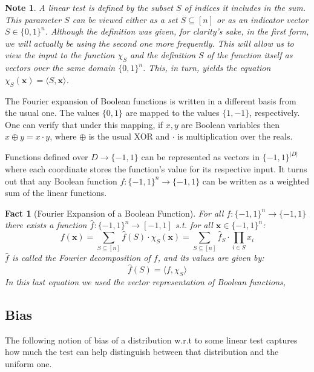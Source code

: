 \documentclass[12pt]{article}
\newtheorem{fact}[theorem]{Fact}
\newtheorem{note}[theorem]{Note}
\newcommand{\zo}[1]{\{0,1\}^{#1}}
\newcommand{\oo}[1]{\{-1,1\}^{#1}}
\newcommand{\abs}[1]{\left| #1 \right|}
\renewcommand{\vec}[1]{\bm{#1}}
\begin{document}
	\begin{note}
		A linear test is defined by the subset $S$ of indices it includes in the sum.
		This parameter $S$ can be viewed either as a set $S \subseteq \left[n\right]$ or as an indicator vector $S \in \zo{n}$.
		Although the definition was given, for clarity's sake, in the first form, we will actually be using the second one more frequently.
		This will allow us to view the input to the function $\chi_S$ and the definition $S$ of the function itself as vectors over the same domain $\zo{n}$.
		This, in turn, yields the equation $\chi_S(\vec{x}) = \langle S, \vec{x} \rangle$.
	\end{note}
	
	The Fourier expansion of Boolean functions is written in a different basis from the usual one.
	The values $\{0,1\}$ are mapped to the values $\{1,-1\}$, respectively.
	One can verify that under this mapping, if $x,y$ are Boolean variables then $x \oplus y = x \cdot y$, where $\oplus$ is the usual XOR and $\cdot$ is multiplication over the reals.
	
	Functions defined over $D \rightarrow \{-1,1\}$ can be represented as vectors in $\{-1,1\}^{\abs{D}}$ where each coordinate stores the function's value for its respective input.
	It turns out that any Boolean function $f : \oo{n} \rightarrow \{-1,1\}$ can be written as a weighted sum of the linear functions.
	\begin{fact}[Fourier Expansion of a Boolean Function] \label{Fact: Fourier expansion}
		For all $f : \oo{n} \rightarrow \{-1,1\}$ there exists a function $\hat{f}: \oo{n} \rightarrow \left[-1,1\right]$ s.t. for all $\vec{x} \in \oo{n}$:
		\begin{equation*}
			f(\vec{x}) = \sum_{S \subseteq \left[n\right]} \hat{f}(S) \cdot \chi_S(\vec{x}) = \sum_{S \subseteq \left[n\right]} \hat{f}_S \cdot \prod_{i \in S} x_i
		\end{equation*}
		$\hat{f}$ is called the \emph{Fourier decomposition} of $f$, and its values are given by:
		\[\hat{f}(S) = \langle f, \chi_S \rangle \]
		In this last equation we used the vector representation of Boolean functions,
	\end{fact}
	
	\subsection{Bias}
	
	The following notion of bias of a distribution w.r.t to some linear test captures how much the test can help distinguish between that distribution and the uniform one.
	
\end{document}
